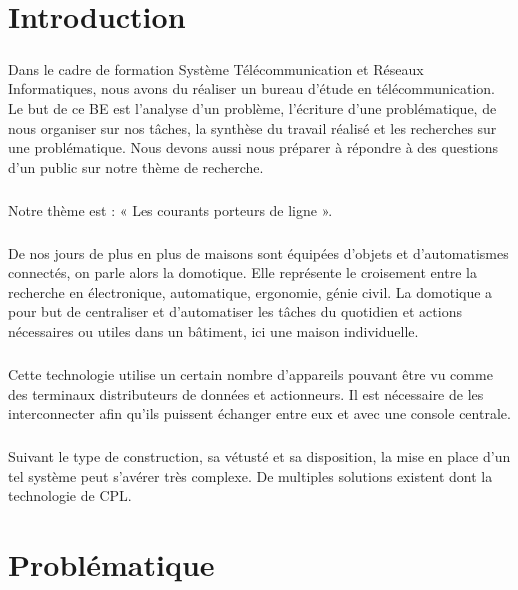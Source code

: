 
\chapter*{Introduction}
    \paragraph{}
Dans le cadre de formation Système Télécommunication et Réseaux Informatiques, nous avons du réaliser un bureau d'étude en télécommunication.
Le but de ce BE est l'analyse d'un problème, l'écriture d'une problématique, de nous organiser sur nos tâches, la synthèse du travail réalisé et les recherches sur une problématique.
Nous devons aussi nous préparer à répondre à des questions d'un public sur notre thème de recherche.
    \paragraph{}
Notre thème est : « Les courants porteurs de ligne ».
    \paragraph{}
De nos jours de plus en plus de maisons sont équipées d'objets et d'automatismes connectés, on parle alors la domotique.
Elle représente le croisement entre la recherche en électronique, automatique, ergonomie, génie civil.
La domotique a pour but de centraliser et d'automatiser les tâches du quotidien et actions nécessaires ou utiles dans un bâtiment, ici une maison individuelle.
    \paragraph{}
Cette technologie utilise un certain nombre d'appareils pouvant être vu comme des terminaux distributeurs de données et actionneurs.
Il est nécessaire de les interconnecter afin qu'ils puissent échanger entre eux et avec une console centrale.
    \paragraph{}
Suivant le type de construction, sa vétusté et sa disposition, la mise en place d'un tel système peut s'avérer très complexe.
De multiples solutions existent dont la technologie de CPL.



\chapter*{Problématique}
